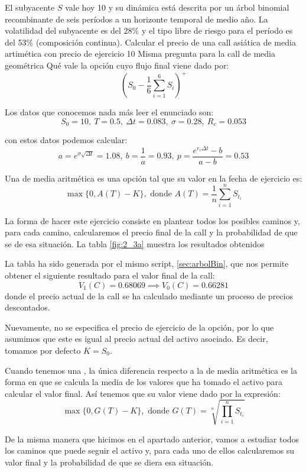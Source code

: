 \begin{problem}[3]
El subyacente $S$ vale hoy 10 y su dinámica está descrita por un árbol binomial recombinante de seis períodos a un horizonte temporal de medio año. La volatilidad del subyacente es del 28\% y el tipo libre de riesgo para el período es del 53\% (composición continua).
\ppart Calcular el precio de una call asiática de media artimética con precio de ejercicio 10
\ppart Misma pregunta para la call de media geométrica
\ppart Qué vale la opción cuyo flujo final viene dado por:
\[(S_0-\frac{1}{6}\sum_{i=1}^6S_i)^+\]
\solution



Los datos que conocemos nada más leer el enunciado son:
\[S_0=10, \ T=0.5, \ Δt = 0.083, \ σ=0.28, \ R_c=0.053\]

con estos datos podemos calcular:
\[a=e^{σ\sqrt{Δt}} = 1.08, \ b = \frac{1}{a} = 0.93, \ p = \frac{e^{r_cΔt}-b}{a-b}=0.53\]

\spart

Una  de media aritmética es una opción tal que su valor en la fecha de ejercicio es:
\[\max\{0, A(T)-K\}, \text{ donde } A(T) = \frac{1}{n} \sum_{i=1}^nS_{t_i}\]

La forma de hacer este ejercicio consiste en plantear todos los posibles caminos y, para cada camino, calcularemos el precio final de la call y la probabilidad de que se de esa situación. La tabla \ref{fig:2_3a} muestra los resultados obtenidos

La tabla ha sido generada por el mismo script, \ref{sec:arbolBin}, que nos permite obtener el siguiente resultado para el valor final de la call:
\[V_1(C) = 0.68069 \implies V_0(C) = 0.66281\]
donde el precio actual de la call se ha calculado mediante un proceso de precios descontados.

\obs Nuevamente, no se especifica el precio de ejercicio de la opción, por lo que asumimos que este es igual al precio actual del activo asociado. Es decir, tomamos por defecto $K=S_0$.

\spart

Cuando tenemos una , la única diferencia respecto a la de media aritmética es la forma en que se calcula la media de los valores que ha tomado el activo para calcular el valor final. Así tenemos que su valor viene dado por la expresión:
\[\max\{0, G(T)-K\}, \text{ donde } G(T) = \sqrt[n]{\prod_{i=1}^nS_{t_i}}\]

De la misma manera que hicimos en el apartado anterior, vamos a estudiar todos los caminos que puede seguir el activo y, para cada uno de ellos calcularemos su valor final y la probabilidad de que se diera esa situación.


\end{problem}
